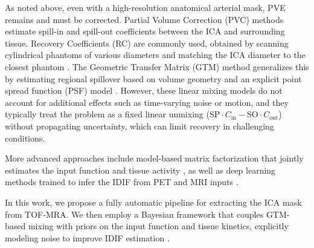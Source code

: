 As noted above, even with a high-resolution anatomical arterial mask, PVE remains and must be corrected.
Partial Volume Correction (PVC) methods estimate spill-in and spill-out coefficients between the ICA and surrounding tissue.
Recovery Coefficients (RC) are commonly used, obtained by scanning cylindrical phantoms of various diameters and matching the ICA diameter to the closest phantom \cite{TODO,TODO,TODO,TODO}.
The Geometric Transfer Matrix (GTM) method generalizes this by estimating regional spillover based on volume geometry and an explicit point spread function (PSF) model \cite{TODO}.
However, these linear mixing models do not account for additional effects such as time-varying noise or motion, and they typically treat the problem as a fixed linear unmixing (\(\text{SP}\cdot C_{\text{in}} - \text{SO}\cdot C_{\text{out}}\)) without propagating uncertainty, which can limit recovery in challenging conditions.

More advanced approaches include model-based matrix factorization that jointly estimates the input function and tissue activity \cite{TODO}, as well as deep learning methods trained to infer the IDIF from PET and MRI inputs \cite{TODO,TODO}.

In this work, we propose a fully automatic pipeline for extracting the ICA mask from TOF-MRA.
We then employ a Bayesian framework that couples GTM-based mixing with priors on the input function and tissue kinetics, explicitly modeling noise to improve IDIF estimation \cite{irace2021bayesian}.

